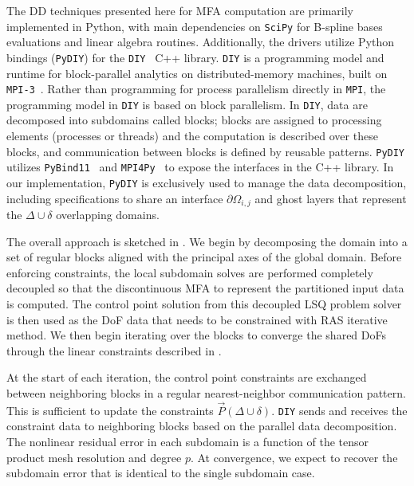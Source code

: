 The DD techniques presented here for MFA computation are primarily implemented in Python, with main dependencies on \texttt{SciPy} for B-spline bases evaluations and linear algebra routines. Additionally, the drivers utilize Python bindings (\texttt{PyDIY}) for the \texttt{DIY}~\cite{morozov16} C++ library. \texttt{DIY} is a programming model and runtime
for block-parallel analytics on distributed-memory machines, built on \texttt{MPI-3}~\cite{dongarra13}.  Rather than programming
for process parallelism directly in \texttt{MPI}, the programming model in \texttt{DIY} is based on block parallelism. In \texttt{DIY}, data are decomposed
into subdomains called blocks; blocks are assigned to processing elements (processes or threads) and the computation is
described over these blocks, and communication between blocks is defined by reusable patterns. 
\texttt{PyDIY} utilizes \texttt{PyBind11}~\cite{jakob17} and \texttt{MPI4Py}~\cite{dalcin11} to expose the interfaces in the C++ library. In our implementation, \texttt{PyDIY} is exclusively used to manage the data decomposition, including specifications to share an interface $\partial \Omega_{i,j}$ and ghost layers that represent the $\Delta \cup  \delta$ overlapping domains.

The overall approach is sketched in .
We begin by decomposing the domain into a set of regular blocks aligned with the principal axes
of the global domain. Before enforcing constraints, the local subdomain solves are performed completely decoupled so that the discontinuous MFA to represent the partitioned input data is computed. %
%
The control point solution from this decoupled LSQ problem solver is then used as the DoF data that needs to be constrained with RAS iterative method.
We then begin iterating over the blocks to converge the shared DoFs through the linear constraints described in . 

At the start of each iteration, the control point constraints are exchanged between neighboring blocks in a regular nearest-neighbor communication pattern. This is sufficient to update the constraints $\vec{P}(\Delta \cup \delta)$. \texttt{DIY} 
sends and receives the constraint data to neighboring blocks based on the parallel data decomposition.
The nonlinear residual error in each subdomain is a function of the tensor product mesh resolution and degree $p$. At convergence, we expect to recover the subdomain error that is identical to the single subdomain case.


